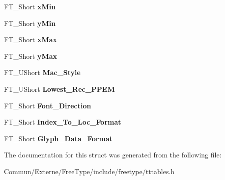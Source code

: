\begin{DoxyCompactItemize}
\item 
F\+T\+\_\+\+Short {\bfseries x\+Min}\hypertarget{struct_t_t___header___ae4553d76427d9f7a28595ed71897dcbb}{}\label{struct_t_t___header___ae4553d76427d9f7a28595ed71897dcbb}

\item 
F\+T\+\_\+\+Short {\bfseries y\+Min}\hypertarget{struct_t_t___header___ac6aad4966bac8a96c5bc48765b3d694a}{}\label{struct_t_t___header___ac6aad4966bac8a96c5bc48765b3d694a}

\item 
F\+T\+\_\+\+Short {\bfseries x\+Max}\hypertarget{struct_t_t___header___a593b9cc3e11532972a7fc96944dd1ae9}{}\label{struct_t_t___header___a593b9cc3e11532972a7fc96944dd1ae9}

\item 
F\+T\+\_\+\+Short {\bfseries y\+Max}\hypertarget{struct_t_t___header___a02d236cd8150c00e886a0c487c04dffa}{}\label{struct_t_t___header___a02d236cd8150c00e886a0c487c04dffa}

\item 
F\+T\+\_\+\+U\+Short {\bfseries Mac\+\_\+\+Style}\hypertarget{struct_t_t___header___a82f2a5a836b802e44ff712b3afc8745c}{}\label{struct_t_t___header___a82f2a5a836b802e44ff712b3afc8745c}

\item 
F\+T\+\_\+\+U\+Short {\bfseries Lowest\+\_\+\+Rec\+\_\+\+P\+P\+EM}\hypertarget{struct_t_t___header___a1d20801c3482dee2529d294441ed9af3}{}\label{struct_t_t___header___a1d20801c3482dee2529d294441ed9af3}

\item 
F\+T\+\_\+\+Short {\bfseries Font\+\_\+\+Direction}\hypertarget{struct_t_t___header___a1cb7d8a2a76ae1acda3ac94bcd555954}{}\label{struct_t_t___header___a1cb7d8a2a76ae1acda3ac94bcd555954}

\item 
F\+T\+\_\+\+Short {\bfseries Index\+\_\+\+To\+\_\+\+Loc\+\_\+\+Format}\hypertarget{struct_t_t___header___a05a488607bfae319de096b4bd9cf8c6d}{}\label{struct_t_t___header___a05a488607bfae319de096b4bd9cf8c6d}

\item 
F\+T\+\_\+\+Short {\bfseries Glyph\+\_\+\+Data\+\_\+\+Format}\hypertarget{struct_t_t___header___adeeedce4bb708c3e068ed80366ec921d}{}\label{struct_t_t___header___adeeedce4bb708c3e068ed80366ec921d}

\end{DoxyCompactItemize}


The documentation for this struct was generated from the following file\+:\begin{DoxyCompactItemize}
\item 
Commun/\+Externe/\+Free\+Type/include/freetype/tttables.\+h\end{DoxyCompactItemize}
